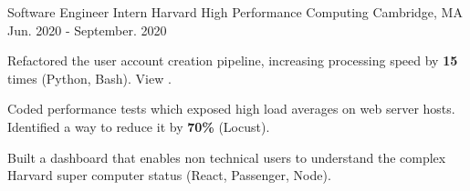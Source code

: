 \begin{cventries}
  \cventry
    {Software Engineer Intern} %
    {Harvard High Performance Computing} %
    {Cambridge, MA} %
    {Jun. 2020 - September. 2020} %
    {
      \begin{cvitems} %
      \item {Refactored the user account creation pipeline, increasing processing speed by \textbf{15} times (Python, Bash). View .} 
      \item {Coded performance tests which exposed high load averages on web server hosts. Identified a way to reduce it by \textbf{70\%} (Locust).}
      \item {Built a dashboard that enables non technical users to understand the complex Harvard super computer status (React, Passenger, Node).}
      \end{cvitems}
    }



\end{cventries}
